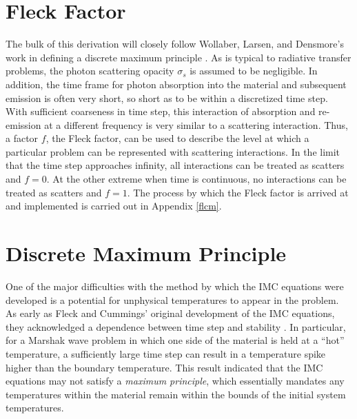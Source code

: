 \section{Fleck Factor}
The bulk of this derivation will closely follow Wollaber, Larsen, and
Densmore's work in defining a discrete maximum principle \cite{WolLarDen}.  As
is typical to radiative transfer problems, the photon scattering opacity
$\sigma_s$ is assumed to be negligible.  In addition, the time
frame for photon absorption into the material and subsequent emission is often
very short, so short as to be within a discretized time step.  With sufficient
coarseness in time step, this interaction of absorption and re-emission at a
different frequency is very similar to a scattering interaction.  Thus, a factor
$f$, the Fleck factor, can be used to describe the level at which a particular
problem can be represented with scattering interactions.  In the limit that the
time step approaches infinity, all interactions can be treated as scatters and
$f=0$. At the other extreme when time is continuous, no interactions can be 
treated as scatters and $f=1$.  The process by which the Fleck factor is
arrived at and implemented is carried out in Appendix \ref{flcm}.


\section{Discrete Maximum Principle}
One of the major difficulties with the method by which the IMC equations were
developed is a potential for unphysical temperatures to appear in the problem. 
As early as Fleck and Cummings' original development of the IMC equations, they
acknowledged a dependence between time step and stability \cite{FleckCumm}.  In
particular, for a Marshak wave problem in which one side of the material 
is held at a ``hot'' temperature, a
sufficiently large time step can result in a temperature spike higher than
the boundary temperature. This result indicated that the IMC equations may not
satisfy a \emph{maximum principle}, which essentially mandates any temperatures
within the material remain
within the bounds of the initial system temperatures.

